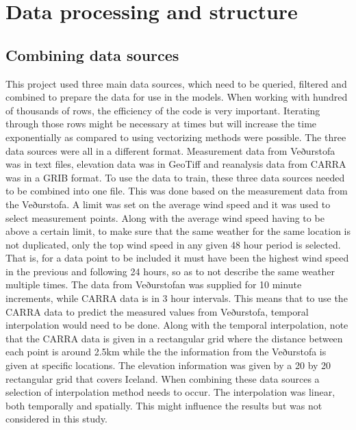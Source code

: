 \chapter{Data processing and structure} %

\label{Chapter3} %


\section{Combining data sources}

This project used three main data sources, which need to be queried, filtered and combined to prepare the data for use in the models. When working with hundred of thousands of rows, the efficiency of the code is very important. Iterating through those rows might be necessary at times but will increase the time exponentially as compared to using vectorizing methods were possible. The three data sources were all in a different format. Measurement data from Veðurstofa was in text files, elevation data was in GeoTiff and reanalysis data from CARRA was in a GRIB format. To use the data to train, these three data sources needed to be combined into one file. This was done based on the measurement data from the Veðurstofa. A limit was set on the average wind speed and it was used to select measurement points. Along with the average wind speed having to be above a certain limit, to make sure that the same weather for the same location is not duplicated, only the top wind speed in any given 48 hour period is selected. That is, for a data point to be included it must have been the highest wind speed in the previous and following 24 hours, so as to not describe the same weather multiple times. The data from Veðurstofan was supplied for 10 minute increments, while CARRA data is in 3 hour intervals. This means that to use the CARRA data to predict the measured values from Veðurstofa, temporal interpolation would need to be done. Along with the temporal interpolation, note that the CARRA data is given in a rectangular grid where the distance between each point is around 2.5km while the the information from the Veðurstofa is given at specific locations. The elevation information was given by a 20 by 20 rectangular grid that covers Iceland. When combining these data sources a selection of interpolation method needs to occur. The interpolation was linear, both temporally and spatially. This might influence the results but was not considered in this study.

